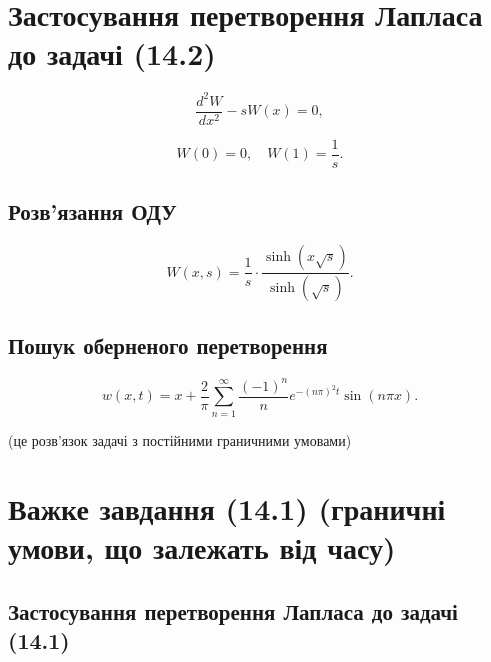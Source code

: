 \section{Застосування перетворення Лапласа до задачі (14.2)}\label{ux437ux430ux441ux442ux43eux441ux443ux432ux430ux43dux43dux44f-ux43fux435ux440ux435ux442ux432ux43eux440ux435ux43dux43dux44f-ux43bux430ux43fux43bux430ux441ux430-ux434ux43e-ux437ux430ux434ux430ux447ux456-14.2}

\[
\frac{d^2 W}{dx^2} - s W(x) = 0,
\]

\[
W(0) = 0, \quad W(1) = \frac{1}{s}.
\]

\subsection{Розв'язання ОДУ}\label{ux440ux43eux437ux432ux44fux437ux430ux43dux43dux44f-ux43eux434ux443}

\[
W(x, s) = \frac{1}{s} \cdot \frac{\sinh(x \sqrt{s})}{\sinh(\sqrt{s})}.
\]

\subsection{Пошук оберненого перетворення}\label{ux43fux43eux448ux443ux43a-ux43eux431ux435ux440ux43dux435ux43dux43eux433ux43e-ux43fux435ux440ux435ux442ux432ux43eux440ux435ux43dux43dux44f}

\[
w(x, t) = x + \frac{2}{\pi} \sum_{n=1}^{\infty} \frac{(-1)^n}{n} e^{-(n\pi)^2 t} \sin(n\pi x).
\]

(це розв'язок задачі з постійними граничними умовами)

\section{Важке завдання (14.1) (граничні умови, що залежать від часу)}\label{ux432ux430ux436ux43aux435-ux437ux430ux432ux434ux430ux43dux43dux44f-14.1-ux433ux440ux430ux43dux438ux447ux43dux456-ux443ux43cux43eux432ux438-ux449ux43e-ux437ux430ux43bux435ux436ux430ux442ux44c-ux432ux456ux434-ux447ux430ux441ux443}

\subsection{Застосування перетворення Лапласа до задачі (14.1)}\label{ux437ux430ux441ux442ux43eux441ux443ux432ux430ux43dux43dux44f-ux43fux435ux440ux435ux442ux432ux43eux440ux435ux43dux43dux44f-ux43bux430ux43fux43bux430ux441ux430-ux434ux43e-ux437ux430ux434ux430ux447ux456-14.1}

